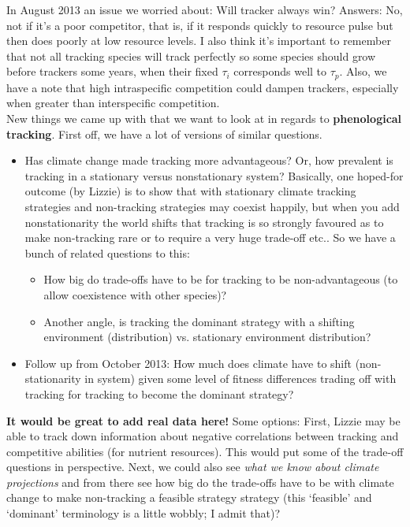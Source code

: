 \documentclass[11pt,a4paper,oneside]{article}
\begin{document}
\noindent In August 2013 an issue we worried about: Will tracker always win? Answers: No, not if it's a poor competitor, that is, if it responds quickly to resource pulse but then does poorly at low resource levels. I also think it's important to remember that not all tracking species will track perfectly so some species should grow before trackers some years, when their fixed \(\tau_{i}\) corresponds well to \(\tau_{p}\). Also, we have a note that high intraspecific competition could dampen trackers, especially when greater than interspecific competition.\\

\noindent New things we came up with that we want to look at in regards to {\bf phenological tracking}. First off, we have a lot of versions of similar questions. 
\begin{itemize}
\item Has climate change made tracking more advantageous? Or, how prevalent is tracking in a stationary versus nonstationary system? Basically, one hoped-for outcome (by Lizzie) is to show that with stationary climate tracking strategies and non-tracking strategies may coexist happily, but when you add nonstationarity the world shifts that tracking is so strongly favoured as to make non-tracking rare or to require a very huge trade-off etc.. So we have a bunch of related questions to this:
\begin{itemize}
\item How big do trade-offs have to be for tracking to be non-advantageous (to allow coexistence with other species)?
\item Another angle, is tracking the dominant strategy with a shifting environment (distribution) vs. stationary environment distribution?
\end{itemize}
\item Follow up from October 2013: How much does climate have to shift (non-stationarity in system) given some level of fitness differences trading off with tracking for tracking to become the dominant strategy?
\end{itemize}
{\bf It would be great to add real data here!} Some options: First, Lizzie may be able to track down information about negative correlations between tracking and competitive abilities (for nutrient resources). This would put some of the trade-off questions in perspective. Next, we could also see  \emph{what we know about climate projections} and from there see how big do the trade-offs have to be with climate change to make non-tracking a feasible strategy strategy (this `feasible' and `dominant' terminology is a little wobbly; I admit that)?\\
\end{document}

